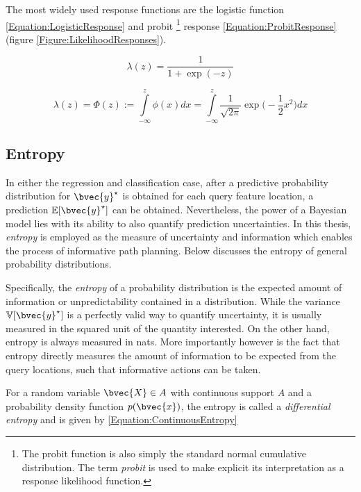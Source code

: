				The most widely used response functions are the logistic function \eqref{Equation:LogisticResponse} and probit \footnote{The probit function is also simply the standard normal cumulative distribution. The term \textit{probit} is used to make explicit its interpretation as a response likelihood function.} response \eqref{Equation:ProbitResponse} (figure \ref{Figure:LikelihoodResponses}).
				
				\begin{equation}
					\lambda(z) = \frac{1}{1 + \exp(-z)}
				\label{Equation:LogisticResponse}
				\end{equation}
				
				\begin{equation}
					\lambda(z) = \Phi(z) := \int\limits_{-\infty}^{z} \phi(x) dx =  \int\limits_{-\infty}^{z} \frac{1}{\sqrt{2 \pi}} \exp\Big(- \frac{1}{2} x^{2}\Big) dx
				\label{Equation:ProbitResponse}
				\end{equation}
				
				\FloatBarrier
		
		\subsection{Entropy}
		\label{Background:GaussianProcesses:Entropy}
		
			In either the regression and classification case, after a predictive probability distribution for $\bvec{y}^{\star}$ is obtained for each query feature location, a prediction $\mathbb{E}[\bvec{y}^{\star}]$ can be obtained. Nevertheless, the power of a Bayesian model lies with its ability to also quantify prediction uncertainties. In this thesis, \textit{entropy} is employed as the measure of uncertainty and information which enables the process of informative path planning. Below discusses the entropy of general probability distributions.
			
			Specifically, the \textit{entropy} of a probability distribution is the expected amount of information or unpredictability contained in a distribution. While the variance $\mathbb{V}[\bvec{y}^{\star}]$ is a perfectly valid way to quantify uncertainty, it is usually measured in the squared unit of the quantity interested. On the other hand, entropy is always measured in nats. More importantly however is the fact that entropy directly measures the amount of information to be expected from the query locations, such that informative actions can be taken.
			
			For a random variable $\bvec{X} \in A$ with continuous support $A$ and a probability density function $p(\bvec{x})$, the entropy is called a \textit{differential entropy} and is given by \eqref{Equation:ContinuousEntropy}
			
